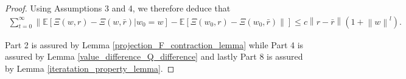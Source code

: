 \documentclass{article}
\begin{document}
\begin{proof}
Using Assumptions 3 and 4, we therefore deduce that
\begin{align}
\sum_{t=0}^\infty\left\|\mathbb{E}\left[\Xi(w,r)-\Xi(w,\bar{r})|w_0=w\right]-\mathbb{E}\left[\Xi(w_0,r)-\Xi(w_0,\bar{r})\right\|\right]\leq c\left\|r-\bar{r}\right\|(1+\left\|w\right\|^l).
\end{align}

Part 2 is assured by Lemma \ref{projection_F_contraction_lemma} while Part 4 is assured by Lemma \ref{value_difference_Q_difference} and lastly Part 8 is assured by Lemma \ref{iteratation_property_lemma}.
\end{proof}


\clearpage


\end{document}
